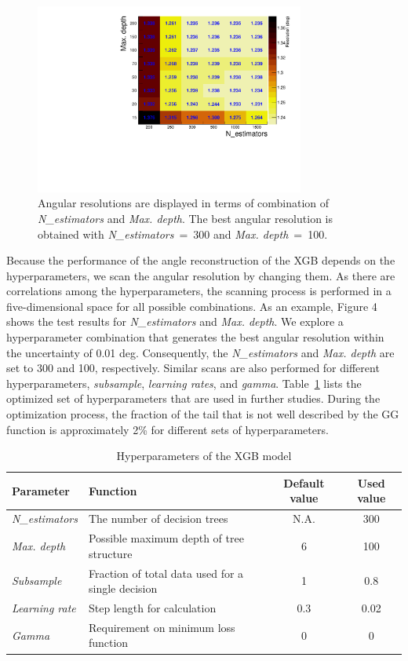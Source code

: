 \documentclass[12pt,times,draftclsnofoot,a4paper]{elsarticle}
\begin{document}
\begin{figure}[!hbt]
\centering
\includegraphics[width=0.79\textwidth]{Fig4_include_ne250.pdf}
\caption{Angular resolutions are displayed in terms of combination of \textit{N\_estimators} and \textit{Max. depth}. The best angular resolution is obtained with \textit{N\_estimators}~=~300 and \textit{Max. depth}~=~100. }
\label{fig:par_scan}
\end{figure}

Because the performance of the angle reconstruction of the XGB depends on the hyperparameters, we scan the angular resolution by changing them. As there are correlations among the hyperparameters, the scanning process is performed in a five-dimensional space for all possible combinations. As an example, Figure 4 shows the test results for \textit{N\_estimators} and \textit{Max. depth}. We explore a hyperparameter combination that generates the best angular resolution within the uncertainty of 0.01 deg. Consequently, the \textit{N\_estimators} and \textit{Max. depth} are set to 300 and 100, respectively. Similar scans are also performed for different hyperparameters, \textit{subsample}, \textit{learning rates}, and \textit{gamma}. Table~\ref{tab:XgbPar} lists the optimized set of hyperparameters that are used in further studies. During the optimization process, the fraction of the tail that is not well described by the GG function is approximately 2\% for different sets of hyperparameters.

\begin{table}[hbt!]{\small
\centering
\caption{Hyperparameters of the XGB model}
\begin{tabular}{llcc}
\hline 
Parameter & Function & Default value & Used value \\ \hline 
\textit{N\_estimators} & The number of decision trees & N.A. & 300 \\  
\textit{Max. depth} & Possible maximum depth of tree structure & 6 & 100 \\ 
\textit{Subsample} & Fraction of total data used for a single decision & 1 & 0.8 \\ 
\textit{Learning rate} & Step length for calculation & 0.3 & 0.02 \\ 
\textit{Gamma} & Requirement on minimum loss function & 0 & 0 \\ 
\hline
\end{tabular}
\label{tab:XgbPar}
}\end{table}
\end{document}
